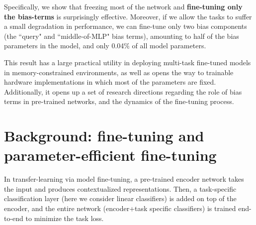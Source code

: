 Specifically, we show that freezing most of the network and \textbf{fine-tuning only the bias-terms} is surprisingly effective. Moreover, if we allow the tasks to suffer a small degradation in performance, we can fine-tune only two bias components (the ``query" and ``middle-of-MLP" bias terms), amounting to half of the bias parameters in the model, and only 0.04\% of all model parameters.

This result has a large practical utility in deploying multi-task fine-tuned models in memory-constrained environments, as well as opens the way to trainable hardware implementations in which most of the parameters are fixed. Additionally, it opens up a set of research directions regarding the role of bias terms in pre-trained networks, and the dynamics of the fine-tuning process.

\section{Background: fine-tuning and parameter-efficient fine-tuning}
\label{sec:background}

In transfer-learning via model fine-tuning, a pre-trained encoder network takes the input and produces contextualized representations. Then, a task-specific classification layer (here we consider linear classifiers) is added on top of the encoder, and the entire network (encoder+task specific classifiers) is trained end-to-end to minimize the task loss.\\


